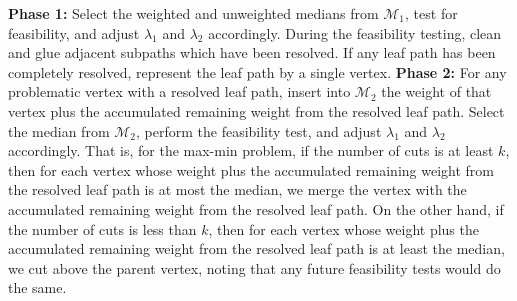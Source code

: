 \documentclass[12pt]{article}
\begin{document}
\begin{spacing}{3}
\vskip 0.2in\noindent
\textbf{Phase 1:} Select the weighted and unweighted medians from $\mathcal{M}_1$, test for feasibility, and adjust $\lambda_1$ and $\lambda_2$ accordingly. During the feasibility testing, clean and glue adjacent subpaths which have been resolved. If any leaf path has been completely resolved, represent the leaf path by a single vertex.
\vskip 0.2in\noindent
\textbf{Phase 2:} For any problematic vertex with a resolved leaf path, insert into $\mathcal{M}_2$ the weight of that vertex plus the accumulated remaining weight from the resolved leaf path. Select the median from $\mathcal{M}_2$, perform the feasibility test, and adjust $\lambda_1$ and $\lambda_2$ accordingly. That is, for the max-min problem, if the number of cuts is at least $k$, then for each vertex whose weight plus the accumulated remaining weight from the resolved leaf path is at most the median, we merge the vertex with the accumulated remaining weight from the resolved leaf path. On the other hand, if the number of cuts is less than $k$, then for each vertex whose weight plus the accumulated remaining weight from the resolved leaf path is at least the median, we cut above the parent vertex, noting that any future feasibility tests would do the same.
 

\end{spacing}
\end{document}
